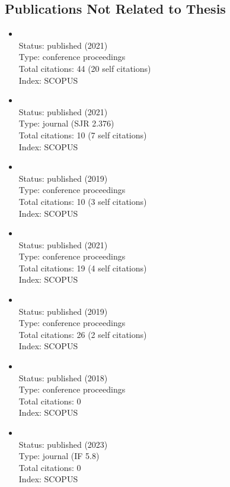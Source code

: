 \begin{refsection}
\section*{Publications Not Related to Thesis}
    \begin{itemize}
		\item{}\vspace{2mm}\\Status: published (2021)\\Type: conference proceedings\\Total citations: 44 (20 self citations)\\Index: SCOPUS
		\item{}\vspace{2mm}\\Status: published (2021)\\Type: journal (SJR 2.376)\\Total citations: 10 (7 self citations)\\Index: SCOPUS
		\item{}\vspace{2mm}\\Status: published (2019)\\Type: conference proceedings\\Total citations: 10 (3 self citations)\\Index: SCOPUS
		\item{}\vspace{2mm}\\Status: published (2021)\\Type: conference proceedings\\Total citations: 19 (4 self citations)\\Index: SCOPUS
		\item{}\vspace{2mm}\\Status: published (2019)\\Type: conference proceedings\\Total citations: 26 (2 self citations)\\Index: SCOPUS
		\item{}\vspace{2mm}\\Status: published (2018)\\Type: conference proceedings\\Total citations: 0\\Index: SCOPUS
		\item{}\vspace{2mm}\\Status: published (2023)\\Type: journal (IF 5.8)\\Total citations: 0\\Index: SCOPUS

\end{itemize}
\end{refsection}
